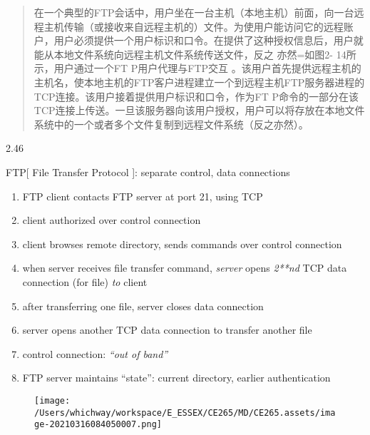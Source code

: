 \documentclass[
]{article}
\begin{document}
\begin{quote}
在一个典型的FTP会话中，用户坐在一台主机（本地主机）前面，向一台远程主机传输（或接收来自远程主机的）文件。为使用户能访问它的远程账户，用户必须提供一个用户标识和口令。在提供了这种授权信息后，用户就能从本地文件系统向远程主机文件系统传送文件，反之
亦然=如图2- 14所示，用户通过一个FT P用户代理与FTP交互
。该用户首先提供远程主机的主机名，使本地主机的FTP客户进程建立一个到远程主机FTP服务器进程的TCP连接。该用户接着提供用户标识和口令，作为FT
P命令的一部分在该TCP连接上传送。一旦该服务器向该用户授权，用户可以将存放在本地文件系统中的一个或者多个文件复制到远程文件系统（反之亦然）。
\end{quote}

2.46

FTP{[} File Transfer Protocol {]}: separate control, data connections

\begin{enumerate}
\def\labelenumi{\arabic{enumi}.}
\item
  FTP client contacts FTP server at port 21, using TCP
\item
  client authorized over control connection
\item
  client browses remote directory, sends commands over control
  connection
\item
  when server receives file transfer command, \emph{server} opens
  \emph{2**nd} TCP data connection (for file) \emph{to} client
\item
  after transferring one file, server closes data connection
\item
  server opens another TCP data connection to transfer another file
\item
  control connection: \emph{``out of band''}
\item
  FTP server maintains ``state'': current directory, earlier
  authentication
\end{enumerate}

\begin{figure}
\centering
\texttt{[image: /Users/whichway/workspace/E\_ESSEX/CE265/MD/CE265.assets/image-20210316084050007.png]}
\caption{}
\end{figure}
\end{document}

